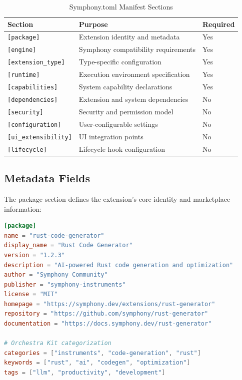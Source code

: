 \begin{table}[h]
\centering
\caption{Symphony.toml Manifest Sections}
\label{tab:manifest-sections}
\begin{tabular}{@{}lll@{}}
\toprule
\textbf{Section} & \textbf{Purpose} & \textbf{Required} \\
\midrule
\texttt{[package]} & Extension identity and metadata & Yes \\
\texttt{[engine]} & Symphony compatibility requirements & Yes \\
\texttt{[extension\_type]} & Type-specific configuration & Yes \\
\texttt{[runtime]} & Execution environment specification & Yes \\
\texttt{[capabilities]} & System capability declarations & Yes \\
\texttt{[dependencies]} & Extension and system dependencies & No \\
\texttt{[security]} & Security and permission model & No \\
\texttt{[configuration]} & User-configurable settings & No \\
\texttt{[ui\_extensibility]} & UI integration points & No \\
\texttt{[lifecycle]} & Lifecycle hook configuration & No \\
\bottomrule
\end{tabular}
\end{table}

\subsection{Metadata Fields}
\label{subsec:metadata-fields}

The package section defines the extension's core identity and marketplace information:

\begin{lstlisting}[language=toml,caption=Package Metadata Example]
[package]
name = "rust-code-generator"
display_name = "Rust Code Generator"
version = "1.2.3"
description = "AI-powered Rust code generation and optimization"
author = "Symphony Community"
publisher = "symphony-instruments"
license = "MIT"
homepage = "https://symphony.dev/extensions/rust-generator"
repository = "https://github.com/symphony/rust-generator"
documentation = "https://docs.symphony.dev/rust-generator"

# Orchestra Kit categorization
categories = ["instruments", "code-generation", "rust"]
keywords = ["rust", "ai", "codegen", "optimization"]
tags = ["llm", "productivity", "development"]
\end{lstlisting}

